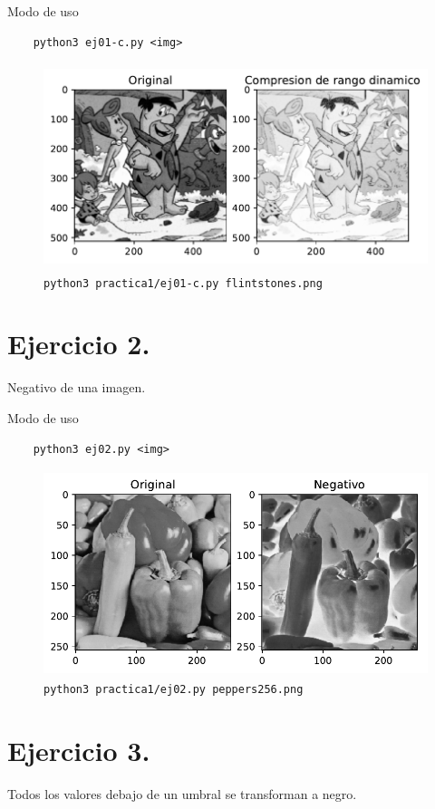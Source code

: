 \documentclass[11pt, spanish]{article}
\begin{document}
Modo de uso
\begin{verbatim}
    python3 ej01-c.py <img>
\end{verbatim}

\begin{figure}[H]
\centering
  \includegraphics[height=6cm]{informe-imgs/ej01-c.pdf}
  \caption{\texttt{python3 practica1/ej01-c.py flintstones.png}}
\end{figure}


\section{Ejercicio 2.}
Negativo de una imagen.

Modo de uso
\begin{verbatim}
    python3 ej02.py <img>
\end{verbatim}

\begin{figure}[H]
\centering
  \includegraphics[height=6cm]{informe-imgs/ej02.pdf}
  \caption{\texttt{python3 practica1/ej02.py peppers256.png}}
\end{figure}


\section{Ejercicio 3.}
Todos los valores debajo de un umbral se transforman a negro.
\end{document}
